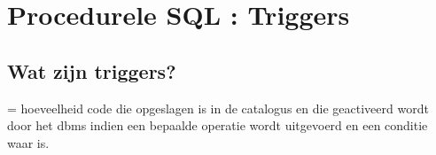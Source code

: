 \newpage

\section{Procedurele SQL : Triggers}

\subsection{Wat zijn triggers?}
= hoeveelheid code die opgeslagen is in de catalogus en die geactiveerd wordt door het dbms indien een bepaalde operatie wordt uitgevoerd en een conditie waar is.
